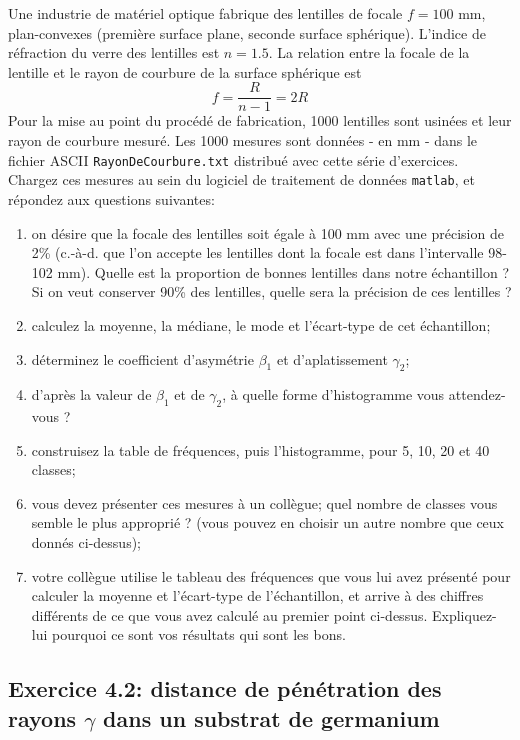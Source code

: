 \documentclass[main.tex]{subfiles}
\begin{document}
Une industrie de matériel optique fabrique des lentilles de focale $f=100$ mm, plan-convexes (première surface plane, seconde surface sphérique). L'indice de réfraction du verre des lentilles est $n=1.5$. La relation entre la focale de la lentille et le rayon de courbure de la surface sphérique est
$$
    f=\frac{R}{n-1}=2R
$$
Pour la mise au point du procédé de fabrication, 1000 lentilles sont usinées et leur rayon de courbure mesuré. Les 1000 mesures sont données - en mm - dans le fichier ASCII \texttt{RayonDeCourbure.txt} distribué avec cette série d'exercices. Chargez ces mesures au sein du logiciel de traitement de données \texttt{matlab}, et répondez aux questions suivantes:
\begin{enumerate}
    \item on désire que la focale des lentilles soit égale à 100 mm avec une précision de 2\% (c.-à-d. que l'on accepte les lentilles dont la focale est dans l'intervalle 98-102 mm). Quelle est la proportion de bonnes lentilles dans notre échantillon ? Si on veut conserver 90\% des lentilles, quelle sera la précision de ces lentilles ?
    \item calculez la moyenne, la médiane, le mode et l'écart-type de cet échantillon;
    \item déterminez le coefficient d'asymétrie $\beta_1$ et d'aplatissement $\gamma_2$;
    \item d'après la valeur de $\beta_1$ et de $\gamma_2$, à quelle forme d'histogramme vous attendez-vous ?
    \item construisez la table de fréquences, puis l'histogramme, pour 5, 10, 20 et 40 classes;
    \item vous devez présenter ces mesures à un collègue; quel nombre de classes vous semble le plus approprié ? (vous pouvez en choisir un autre nombre que ceux donnés ci-dessus);
    \item votre collègue utilise le tableau des fréquences que vous lui avez présenté pour calculer la moyenne et l'écart-type de l'échantillon, et arrive à des chiffres différents de ce que vous avez calculé au premier point ci-dessus. Expliquez-lui pourquoi ce sont vos résultats qui sont les bons.
\end{enumerate}

\subsection{Exercice 4.2: distance de pénétration des rayons $\gamma$ dans un substrat de germanium}
\end{document}
